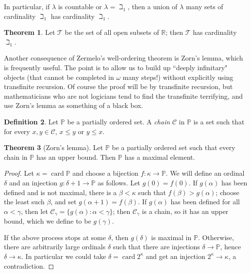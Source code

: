 \documentclass[12pt]{book}
\newcommand{\RR}{\mathbb{R}}
\newcommand{\PP}{\mathbb{P}}
\DeclareMathOperator{\card}{card}
\newcommand{\dfn}[1]{\emph{#1}\index{#1}}
\theoremstyle{definition}
\newtheorem{theorem}{Theorem}[section]
\newtheorem{definition}[theorem]{Definition}
\begin{document}
In particular, if $\lambda$ is countable or $\lambda = \beth_1$, then a union of $\lambda$ many sets of cardinality $\beth_1$ has cardinality $\beth_1$.

\begin{theorem}
\label{cardinality of topology}
Let $\mathcal T$ be the set of all open subsets of $\RR$; then $\mathcal T$ has cardinality $\beth_1$.
\end{theorem}

Another consequence of Zermelo's well-ordering theorem is Zorn's lemma, which is frequently useful.
The point is to allow us to build up ``deeply infinitary" objects (that cannot be completed in $\omega$ many steps!) without explicitly using transfinite recursion.
Of course the proof will be by transfinite recursion, but mathematicians who are not logicians tend to find the transfinite terrifying, and use Zorn's lemma as something of a black box.

\begin{definition}
Let $\PP$ be a partially ordered set. A \dfn{chain} $\mathcal C$ in $\PP$ is a set such that for every $x, y \in \mathcal C$, $x \leq y$ or $y \leq x$.
\end{definition}

\begin{theorem}[Zorn's lemma]
Let $\PP$ be a partially ordered set such that every chain in $\PP$ has an upper bound.
Then $\PP$ has a maximal element.
\end{theorem}
\begin{proof}
Let $\kappa = \card \PP$ and choose a bijection $f: \kappa \to \PP$.
We will define an ordinal $\delta$ and an injection $g: \delta + 1 \to \PP$ as follows.
Let $g(0) = f(0)$. If $g(\alpha)$ has been defined and is not maximal, there is a $\beta < \kappa$ such that $f(\beta) > g(\alpha)$; choose the least such $\beta$, and set $g(\alpha + 1) = f(\beta)$.
If $g(\alpha)$ has been defined for all $\alpha < \gamma$, then let $\mathcal C_\gamma = \{g(\alpha): \alpha < \gamma\}$; then $\mathcal C_\gamma$ is a chain, so it has an upper bound, which we define to be $g(\gamma)$.

If the above process stops at some $\delta$, then $g(\delta)$ is maximal in $\PP$.
Otherwise, there are arbitrarily large ordinals $\delta$ such that there are injections $\delta \to \PP$, hence $\delta \to \kappa$.
In particular we could take $\delta = \card 2^\kappa$ and get an injection $2^\kappa \to \kappa$, a contradiction.
\end{proof}
\end{document}
